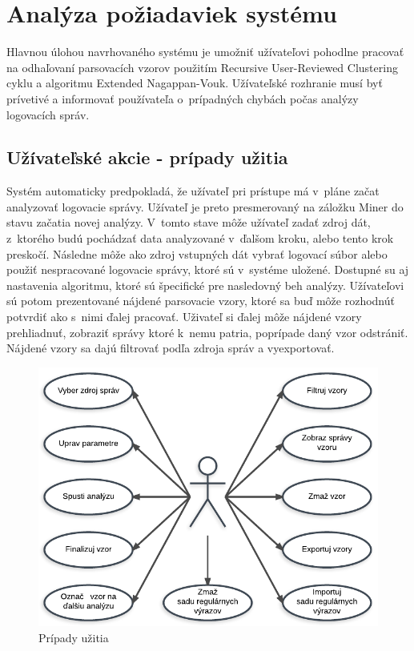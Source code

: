 \chapter{Analýza požiadaviek systému}

Hlavnou úlohou navrhovaného systému je umožniť užívateľovi pohodlne pracovať na odhaľovaní parsovacích vzorov použitím Recursive User-Reviewed Clustering cyklu a algoritmu Extended Nagappan-Vouk. Užívateľské rozhranie musí byť prívetivé a informovať používateľa o~prípadných chybách počas analýzy logovacích správ.

\section{Užívateľské akcie - prípady užitia}

Systém automaticky predpokladá, že užívateľ pri prístupe má v~pláne začat analyzovať logovacie správy. Užívateľ je preto presmerovaný na záložku Miner do stavu začatia novej analýzy. V~tomto stave môže užívateľ zadať zdroj dát, z~ktorého budú pochádzať data analyzované v~ďalšom kroku, alebo tento krok preskočí. Následne môže ako zdroj vstupných dát vybrať logovací súbor alebo použiť nespracované logovacie správy, ktoré sú v~systéme uložené. Dostupné su aj nastavenia algoritmu, ktoré sú špecifické pre nasledovný beh analýzy. Užívateľovi sú potom prezentované nájdené parsovacie vzory, ktoré sa buď môže rozhodnúť potvrdiť ako s~nimi ďalej pracovať. Uživateľ si ďalej môže nájdené vzory prehliadnuť, zobraziť správy ktoré k~nemu patria, poprípade daný vzor odstrániť. Nájdené vzory sa dajú filtrovať podľa zdroja správ a vyexportovať.

\begin{figure}[htbp]
 \centering 
 \begin{minipage}{0.9\linewidth}
 	\centering
 	\includegraphics[width=\textwidth]{Images/thesis-use-cases.pdf}	
 \end{minipage}
  \caption{Prípady užitia}
  \label{fig:use-cases}
\end{figure}

